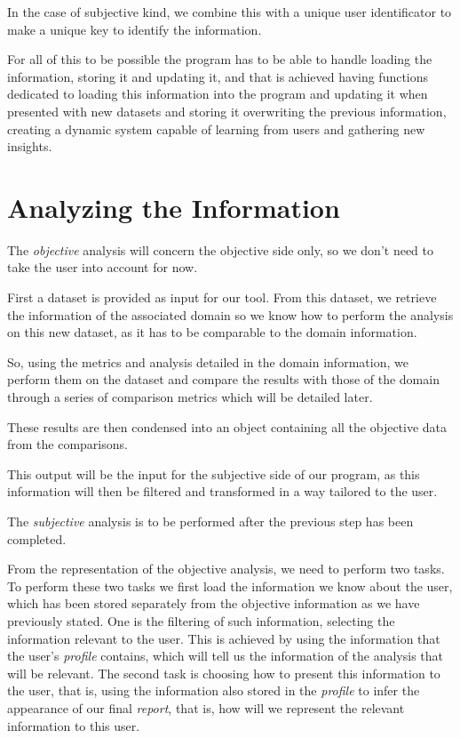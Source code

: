 In the case of subjective kind, we combine this with a unique user identificator to make a unique key to identify the information.

For all of this to be possible the program has to be able to handle loading the information, storing it and updating it, and that is achieved having functions dedicated to loading this information into the program and updating it when presented with new datasets and storing it overwriting the previous information, creating a dynamic system capable of learning from users and gathering new insights.

\section{Analyzing the Information}
\label{cap2:sec:analysis}

The \textit{objective} analysis will concern the objective side only, so we don't need to take the user into account for now.

First a dataset is provided as input for our tool. From this dataset, we retrieve the information of the associated domain so we know how to perform the analysis on this new dataset, as it has to be comparable to the domain information.

So, using the metrics and analysis detailed in the domain information, we perform them on the dataset and compare the results with those of the domain through a series of comparison metrics which will be detailed later.

These results are then condensed into an object containing all the objective data from the comparisons.

This output will be the input for the subjective side of our program, as this information will then be filtered and transformed in a way tailored to the user.

The \textit{subjective} analysis is to be performed after the previous step has been completed.

From the representation of the objective analysis, we need to perform two tasks.
To perform these two tasks we first load the information we know about the user, which has been stored separately from the objective information as we have previously stated.
One is the filtering of such information, selecting the information relevant to the user. This is achieved by using the information that the user's \textit{profile} contains, which will tell us the information of the analysis that will be relevant.
The second task is choosing how to present this information to the user, that is, using the information also stored in the \textit{profile} to infer the appearance of our final \textit{report}, that is, how will we represent the relevant information to this user.

